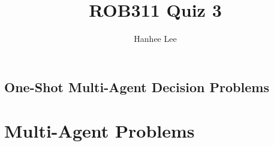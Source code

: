 \documentclass{article}
\title{ROB311 Quiz 3}
\author{Hanhee Lee}
\begin{document}
\maketitle

\tableofcontents
\newpage

\begin{center}
    \section*{One-Shot Multi-Agent Decision Problems}
\end{center}

\section{Multi-Agent Problems}

\end{document}
